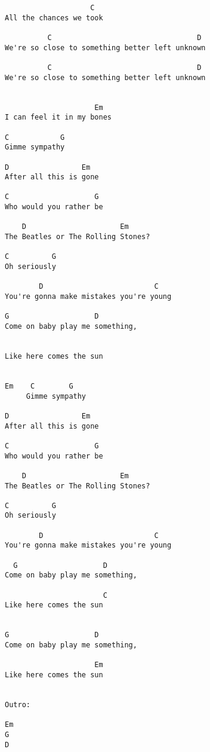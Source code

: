 \documentclass[leqno]{memoir}
\begin{document}
\begin{verbatim}
                    C
All the chances we took

          C                                  D
We're so close to something better left unknown

          C                                  D
We're so close to something better left unknown

 
                     Em
I can feel it in my bones

C            G
Gimme sympathy

D                 Em
After all this is gone

C                    G
Who would you rather be
   
    D                      Em
The Beatles or The Rolling Stones?

C          G
Oh seriously

        D                          C
You're gonna make mistakes you're young

G                    D
Come on baby play me something,

                    
Like here comes the sun 


Em    C        G
     Gimme sympathy

D                 Em
After all this is gone

C                    G
Who would you rather be
   
    D                      Em
The Beatles or The Rolling Stones?

C          G
Oh seriously

        D                          C
You're gonna make mistakes you're young

  G                    D
Come on baby play me something,

                       C                   
Like here comes the sun 


G                    D
Come on baby play me something,

                     Em                   
Like here comes the sun 


Outro:

Em
G
D
\end{verbatim}
\newpage
\end{document}

